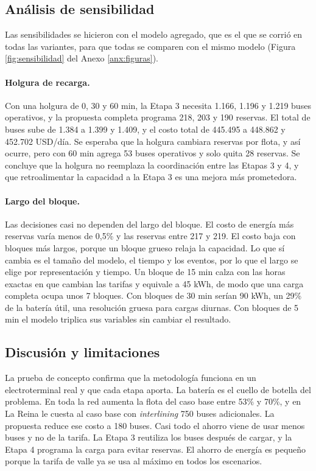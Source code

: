 \subsection{Análisis de sensibilidad}
\label{sec:sensibilidad}

Las sensibilidades se hicieron con el modelo agregado, que es el que se corrió en todas las variantes, para que todas se comparen con el mismo modelo (Figura \ref{fig:sensibilidad} del Anexo \ref{anx:figuras}).

\paragraph{Holgura de recarga.}
Con una holgura de 0, 30 y 60 min, la Etapa 3 necesita 1.166, 1.196 y 1.219 buses operativos, y la propuesta completa programa 218, 203 y 190 reservas. El total de buses sube de 1.384 a 1.399 y 1.409, y el costo total de 445.495 a 448.862 y 452.702 USD/día. Se esperaba que la holgura cambiara reservas por flota, y así ocurre, pero con 60 min agrega 53 buses operativos y solo quita 28 reservas. Se concluye que la holgura no reemplaza la coordinación entre las Etapas 3 y 4, y que retroalimentar la capacidad a la Etapa 3 es una mejora más prometedora.

\paragraph{Largo del bloque.}
Las decisiones casi no dependen del largo del bloque. El costo de energía más reservas varía menos de 0,5\% y las reservas entre 217 y 219. El costo baja con bloques más largos, porque un bloque grueso relaja la capacidad. Lo que sí cambia es el tamaño del modelo, el tiempo y los eventos, por lo que el largo se elige por representación y tiempo. Un bloque de 15 min calza con las horas exactas en que cambian las tarifas y equivale a 45 kWh, de modo que una carga completa ocupa unos 7 bloques. Con bloques de 30 min serían 90 kWh, un 29\% de la batería útil, una resolución gruesa para cargas diurnas. Con bloques de 5 min el modelo triplica sus variables sin cambiar el resultado.

\subsection{Discusión y limitaciones}
\label{sec:discusion}

La prueba de concepto confirma que la metodología funciona en un electroterminal real y que cada etapa aporta. La batería es el cuello de botella del problema. En toda la red aumenta la flota del caso base entre 53\% y 70\%, y en La Reina le cuesta al caso base con \textit{interlining} 750 buses adicionales. La propuesta reduce ese costo a 180 buses. Casi todo el ahorro viene de usar menos buses y no de la tarifa. La Etapa 3 reutiliza los buses después de cargar, y la Etapa 4 programa la carga para evitar reservas. El ahorro de energía es pequeño porque la tarifa de valle ya se usa al máximo en todos los escenarios.

